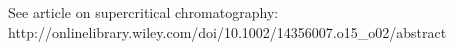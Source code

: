 See article on supercritical chromatography: http://onlinelibrary.wiley.com/doi/10.1002/14356007.o15_o02/abstract